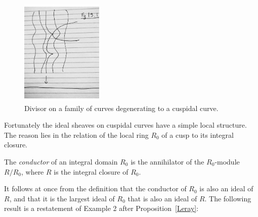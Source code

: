 \begin{figure}
\begin{center}
\centerline {\includegraphics[height=2in]{"Fig13.1.pdf"}}
\caption{Divisor on a family of curves degenerating to a cuspidal curve.}
\label{Fig13.1}
\end{center}
\end{figure}

%

Fortunately the ideal sheaves on cuspidal curves have a simple local structure. The reason lies in the relation of the local ring $R_{0}$ of a cusp to its integral closure. 

\begin{definition}
The \emph{conductor} of an integral domain $R_{0}$ is the annihilator of the $R_{0}$-module
$R/R_{0}$, where $R$ is the integral closure of $R_{0}$.
\end{definition}

It follows at once from the definition that the conductor of $R_{0}$ is also an ideal of $R$, and that it is the largest ideal of $R_{0}$ that is also
an ideal of $R$. The following result is a restatement of Example 2 after Proposition~\ref{Leray}:

